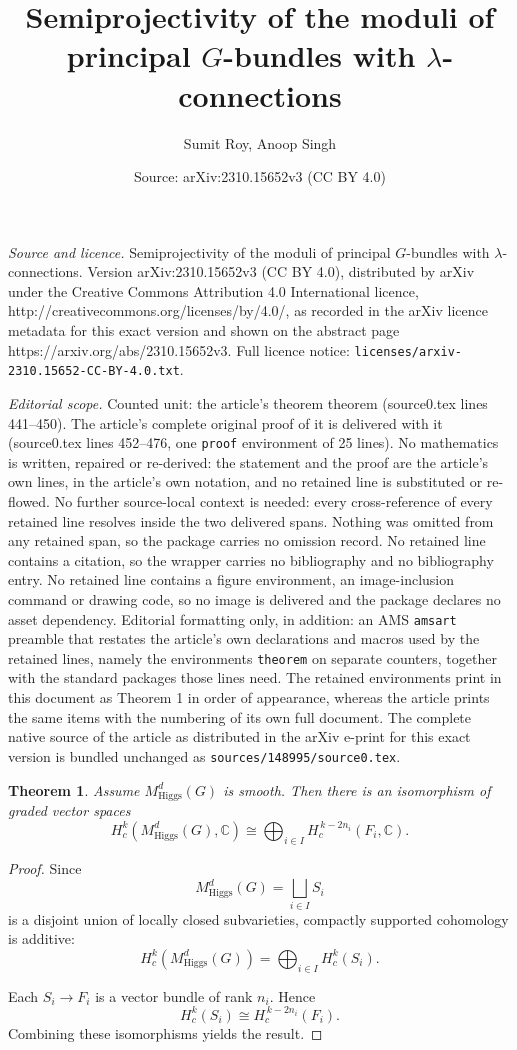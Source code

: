 \documentclass[10pt,a4paper]{amsart}
\title{Semiprojectivity of the moduli of principal $G$-bundles with $\lambda$-connections}
\author{Sumit Roy, Anoop Singh}
\date{Source: arXiv:2310.15652v3 (CC BY 4.0)}
\newtheorem{theorem}{Theorem}
\begin{document}
\maketitle

\noindent\emph{Source and licence.} Semiprojectivity of the moduli of principal $G$-bundles with $\lambda$-connections. Version arXiv:2310.15652v3 (CC BY 4.0), distributed by arXiv under the Creative Commons Attribution 4.0 International licence, http://creativecommons.org/licenses/by/4.0/, as recorded in the arXiv licence metadata for this exact version and shown on the abstract page https://arxiv.org/abs/2310.15652v3. Full licence notice: \texttt{licenses/arxiv-2310.15652-CC-BY-4.0.txt}.\par\smallskip

\noindent\textit{Editorial scope.} Counted unit: the article's theorem theorem (source0.tex lines 441--450). The article's complete original proof of it is delivered with it (source0.tex lines 452--476, one \texttt{proof} environment of 25 lines). No mathematics is written, repaired or re-derived: the statement and the proof are the article's own lines, in the article's own notation, and no retained line is substituted or re-flowed.  No further source-local context is needed: every cross-reference of every retained line resolves inside the two delivered spans.  Nothing was omitted from any retained span, so the package carries no omission record.  No retained line contains a citation, so the wrapper carries no bibliography and no bibliography entry.  No retained line contains a figure environment, an image-inclusion command or drawing code, so no image is delivered and the package declares no asset dependency.  Editorial formatting only, in addition: an AMS \texttt{amsart} preamble that restates the article's own declarations and macros used by the retained lines, namely the environments \texttt{theorem} on separate counters, together with the standard packages those lines need.  The retained environments print in this document as Theorem 1 in order of appearance, whereas the article prints the same items with the numbering of its own full document.  The complete native source of the article as distributed in the arXiv e-print for this exact version is bundled unchanged as \texttt{sources/148995/source0.tex}.
\begin{theorem}
Assume $M^d_{\mathrm{Higgs}}(G)$ is smooth.
Then there is an isomorphism of graded vector spaces
\[
H_c^k\!\left(M^d_{\mathrm{Higgs}}(G),\mathbb{C}\right)
\cong
\bigoplus_{i\in I}
H_c^{\,k-2n_i}(F_i,\mathbb{C}).
\]
\end{theorem}

\begin{proof}
Since
\[
M^d_{\mathrm{Higgs}}(G)
=
\bigsqcup_{i\in I} S_i
\]
is a disjoint union of locally closed subvarieties,
compactly supported cohomology is additive:
\[
H_c^k\!\left(M^d_{\mathrm{Higgs}}(G)\right)
=
\bigoplus_{i\in I}
H_c^k(S_i).
\]

Each $S_i \to F_i$ is a vector bundle of rank $n_i$.
Hence
\[
H_c^k(S_i)
\cong
H_c^{\,k-2n_i}(F_i).
\]
Combining these isomorphisms yields the result.
\end{proof}
\end{document}
